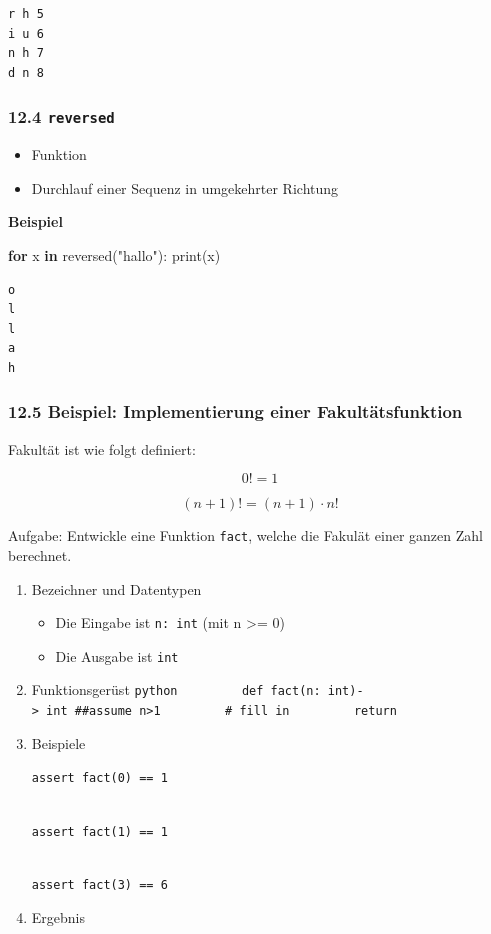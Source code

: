 \documentclass[
  11pt,
  a4paper,
  DIV=11,
  numbers=noendperiod]{scrartcl}
\newenvironment{Shaded}{\begin{snugshade}}{\end{snugshade}}
\newcommand{\BuiltInTok}[1]{\textcolor[rgb]{0.00,0.23,0.31}{#1}}
\newcommand{\ControlFlowTok}[1]{\textcolor[rgb]{0.00,0.23,0.31}{\textbf{#1}}}
\newcommand{\KeywordTok}[1]{\textcolor[rgb]{0.00,0.23,0.31}{\textbf{#1}}}
\newcommand{\NormalTok}[1]{\textcolor[rgb]{0.00,0.23,0.31}{#1}}
\newcommand{\StringTok}[1]{\textcolor[rgb]{0.13,0.47,0.30}{#1}}
\providecommand{\tightlist}{%
  \setlength{\itemsep}{0pt}\setlength{\parskip}{0pt}}
\begin{document}
\begin{verbatim}
r h 5
i u 6
n h 7
d n 8
\end{verbatim}

\subsubsection{\texorpdfstring{12.4
\texttt{reversed}}{12.4 reversed}}\label{reversed}

\begin{itemize}
\tightlist
\item
  Funktion
\item
  Durchlauf einer Sequenz in umgekehrter Richtung
\end{itemize}

\textbf{Beispiel}

\begin{Shaded}
\begin{Highlighting}[numbers=left,,]
\ControlFlowTok{for}\NormalTok{ x }\KeywordTok{in} \BuiltInTok{reversed}\NormalTok{(}\StringTok{"hallo"}\NormalTok{):}
    \BuiltInTok{print}\NormalTok{(x)}
\end{Highlighting}
\end{Shaded}

\begin{verbatim}
o
l
l
a
h
\end{verbatim}

\subsubsection{12.5 Beispiel: Implementierung einer
Fakultätsfunktion}\label{beispiel-implementierung-einer-fakultuxe4tsfunktion}

Fakultät ist wie folgt definiert:

\[0! = 1\]

\[(n+1)! = (n+1)\cdot n!\]

Aufgabe: Entwickle eine Funktion \texttt{fact}, welche die Fakulät einer
ganzen Zahl berechnet.

\begin{enumerate}
\def\labelenumi{\arabic{enumi}.}
\item
  Bezeichner und Datentypen

  \begin{itemize}
  \tightlist
  \item
    Die Eingabe ist \texttt{n:\ int} (mit n \textgreater= 0)
  \item
    Die Ausgabe ist \texttt{int}
  \end{itemize}
\item
  Funktionsgerüst
  \texttt{python\ \ \ \ \ \ \ \ \ def\ fact(n:\ int)-\textgreater{}\ int\ \#\#assume\ n\textgreater{}1\ \ \ \ \ \ \ \ \ \#\ fill\ in\ \ \ \ \ \ \ \ \ return}
\item
  Beispiele

  \texttt{assert\ fact(0)\ ==\ 1}\strut \\
  \texttt{assert\ fact(1)\ ==\ 1}\strut \\
  \texttt{assert\ fact(3)\ ==\ 6}
\item
  Ergebnis
\end{enumerate}
\end{document}
